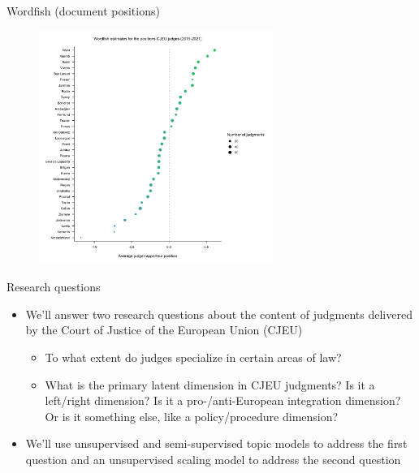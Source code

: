 \documentclass[pdf, 9pt, fleqn, handout]{beamer}
\begin{document}
\begin{frame}{Wordfish (document positions)}
\begin{figure}
\centering
\includegraphics[width = 3in]{judge_positions}
\end{figure}
\end{frame}

\begin{frame}{Research questions}
\begin{itemize}
\item We'll answer two research questions about the content of judgments delivered by the Court of Justice of the European Union (CJEU) \\[0.5em]
\begin{itemize}
\item To what extent do judges specialize in certain areas of law? \\[1em]
\item What is the primary latent dimension in CJEU judgments? Is it a left/right dimension? Is it a pro-/anti-European integration dimension? Or is it something else, like a policy/procedure dimension? \\[3em]
\end{itemize}
\item We'll use unsupervised and semi-supervised topic models to address the first question and an unsupervised scaling model to address the second question
\end{itemize}
\end{frame}
\end{document}
